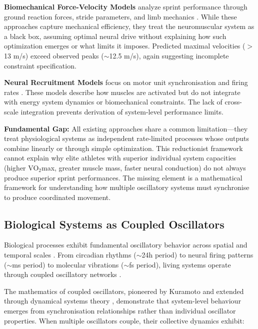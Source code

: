 \documentclass[10pt]{article}
\begin{document}
\textbf{Biomechanical Force-Velocity Models} analyze sprint performance through ground reaction forces, stride parameters, and limb mechanics \citep{weyand2000faster,morin2011mechanical}. While these approaches capture mechanical efficiency, they treat the neuromuscular system as a black box, assuming optimal neural drive without explaining how such optimization emerges or what limits it imposes. Predicted maximal velocities ($>$13 m/s) exceed observed peaks ($\sim$12.5 m/s), again suggesting incomplete constraint specification.

\textbf{Neural Recruitment Models} focus on motor unit synchronisation and firing rates \citep{van1988motor,enoka2008neuromechanics}. These models describe how muscles are activated but do not integrate with energy system dynamics or biomechanical constraints. The lack of cross-scale integration prevents derivation of system-level performance limits.

\textbf{Fundamental Gap:} All existing approaches share a common limitation—they treat physiological systems as independent rate-limited processes whose outputs combine linearly or through simple optimization. This reductionist framework cannot explain why elite athletes with superior individual system capacities (higher VO$_2$max, greater muscle mass, faster neural conduction) do not always produce superior sprint performances. The missing element is a mathematical framework for understanding how multiple oscillatory systems must synchronise to produce coordinated movement.

\subsection{Biological Systems as Coupled Oscillators}

Biological processes exhibit fundamental oscillatory behavior across spatial and temporal scales \citep{glass2001synchronization,goldbeter1996biochemical}. From circadian rhythms ($\sim$24h period) to neural firing patterns ($\sim$ms period) to molecular vibrations ($\sim$fs period), living systems operate through coupled oscillatory networks \citep{strogatz2003sync,pikovsky2003synchronization}.

The mathematics of coupled oscillators, pioneered by Kuramoto \citep{kuramoto1984chemical} and extended through dynamical systems theory \citep{strogatz2014nonlinear}, demonstrate that system-level behaviour emerges from synchronisation relationships rather than individual oscillator properties. When multiple oscillators couple, their collective dynamics exhibit:
\end{document}
